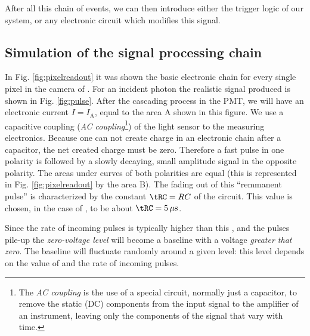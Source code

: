 After all this chain of events, we can then introduce either the
trigger logic of our system, or any electronic circuit which modifies
this signal.

\subsection{Simulation of the signal processing chain}

In Fig. \ref{fig:pixelreadout} it was shown the basic electronic chain
for every single pixel in the camera of \MAGIC. For an incident photon
the realistic signal produced is shown in Fig. \ref{fig:pulse}. After
the cascading process in the PMT, we will have an electronic current
$I=I_{\mathrm{A}}$, equal to the area A shown in this figure.  We use
a capacitive coupling (\emph{AC coupling}\footnote{The \emph{AC
    coupling} is the use of a special circuit, normally just a
  capacitor, to remove the static (DC) components from the input
  signal to the amplifier of an instrument, leaving only the
  components of the signal that vary with time.})
of the light sensor to the measuring electronics. Because one can not
create charge in an electronic chain after a capacitor, the net
created charge must be zero. Therefore a fast pulse in one polarity is
followed by a slowly decaying, small amplitude signal in the opposite
polarity. The areas under curves of both polarities are equal
(this is represented in Fig. \ref{fig:pixelreadout} by the area B). The
fading out of this ``remmanent pulse'' is characterized by the
constant $\tRC=RC$ of the circuit. This value is chosen, in the case
of \MAGIC, to be about $\tRC=5\,\mu\mathrm{s}$.

Since the rate of incoming pulses is typically higher than this \tRC,
and the pulses pile-up the \emph{zero-voltage level} will become a
baseline with a voltage \emph{greater that zero}. The baseline will
fluctuate randomly around a given level: this level depends on the
value of \tRC and the rate of incoming pulses.

